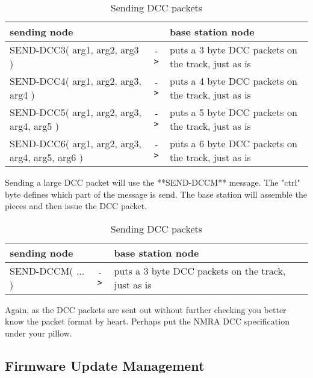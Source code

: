 \begin{table}[ht!]
    \begin{center}
        \caption{Sending DCC packets}
        \begin{tabular}{|p{}| c |p{}|}
            \toprule
            \textbf{sending node} & & \textbf{ base station node} \\
            \midrule
            SEND-DCC3( arg1, arg2, arg3 ) & \texttt{->} & puts a 3 byte DCC packets on the track, just as is \\
            SEND-DCC4( arg1, arg2, arg3, arg4 ) & \texttt{->} & puts a 4 byte DCC packets on the track, just as is \\
            SEND-DCC5( arg1, arg2, arg3, arg4, arg5 ) & \texttt{->} & puts a 5 byte DCC packets on the track, just as is \\
            SEND-DCC6( arg1, arg2, arg3, arg4, arg5, arg6 ) & \texttt{->} & puts a 6 byte DCC packets on the track, just as is \\
            \bottomrule
        \end{tabular}
    \end{center}
\end{table}

Sending a large DCC packet will use the **SEND-DCCM** message. The "ctrl" byte defines which part of the message is send. The base station will assemble the pieces and then issue the DCC packet. 

\begin{table}[ht!]
    \begin{center}
        \caption{Sending DCC packets}
        \begin{tabular}{|p{}| c |p{}|}
            \toprule
            \textbf{sending node} & & \textbf{ base station node} \\
            \midrule
            SEND-DCCM( ... ) & \texttt{->} & puts a 3 byte DCC packets on the track, just as is \\
            \bottomrule
        \end{tabular}
    \end{center}
\end{table}

Again, as the DCC packets are sent out without further checking you better know the packet format by heart. Perhaps put the NMRA DCC specification under your pillow.

\subsection{Firmware Update Management}

